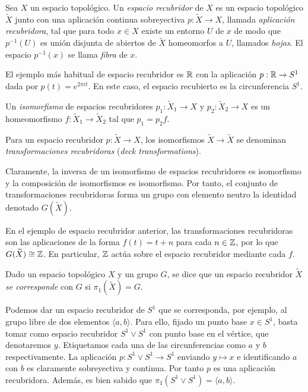 \documentclass[TFG.tex]{subfiles}
\begin{document}
\begin{defi}
Sea $X$ un espacio topológico. Un \emph{espacio recubridor} de $X$ es un espacio topológico $\widetilde{X}$ junto con una aplicación continua sobreyectiva $p:\widetilde{X}\to X$, llamada \emph{aplicación recubridora}, tal que para todo $x\in X$ existe un entorno $U$ de $x$ de modo que $p^{-1}(U)$ es unión disjunta de abiertos de $\widetilde{X}$ homeomorfos a $U$, llamados \emph{hojas}. El espacio $p^{-1}(x)$ se llama \emph{fibra} de $x$.
\end{defi}

\begin{ej}
El ejemplo más habitual de espacio recubridor es $\mathbb{R}$ con la aplicación $p:\mathbb{R}\to S^1$ dada por $p(t)=e^{2\pi i t}$. En este caso, el espacio recubierto es la circunferencia $S^1$. 
\end{ej}

\begin{defi}
Un \emph{isomorfismo} de espacios recubridores $p_1:\widetilde{X}_1\to X$ y $p_2:\widetilde{X}_2\to X$ es un homeomorfismo $f:\widetilde{X}_1\to\widetilde{X}_2$ tal que $p_1=p_2f$.
\end{defi}

\begin{defi}
Para un espacio recubridor $p:\widetilde{X}\to X$, los isomorfismos $\widetilde{X}\to\widetilde{X}$ se denominan \emph{transformaciones recubridoras} (\emph{deck transformations}). 
\end{defi}

Claramente, la inversa de un isomorfismo de espacios recubridores es isomorfismo y la composición de isomorfismos es isomorfismo. Por tanto, el conjunto de transformaciones recubridoras forma un grupo con elemento neutro la identidad denotado $G(\widetilde{X})$. 

\begin{ej}
En el ejemplo de espacio recubridor anterior, las transformaciones recubridoras son las aplicaciones de la forma $f(t)=t+n$ para cada $n\in\mathbb{Z}$, por lo que $G(\widetilde{X})\cong\mathbb{Z}$. En particular, $\mathbb{Z}$ actúa sobre el espacio recubridor mediante cada $f$. 
\end{ej}

\begin{defi}
Dado un espacio topológico $X$ y un grupo $G$, se dice que un espacio recubridor $\widetilde{X}$ \emph{se corresponde} con $G$ si $\pi_1(\widetilde{X})=G$. 
\end{defi}

\begin{ej}
Podemos dar un espacio recubridor de $S^1$ que se corresponda, por ejemplo, al grupo libre de dos elementos $\langle a, b\rangle$. Para ello, fijado un punto base $x\in S^1$, basta tomar como espacio recubridor $S^1\lor S^1$ con punto base en el vértice, que denotaremos $y$. Etiquetamos cada una de las circunferencias como $a$ y $b$ respectivamente. La aplicación $p:S^1\lor S^1\to S^1$ enviando $y\mapsto x$ e identificando $a$ con $b$ es claramente sobreyectiva y continua. Por tanto $p$ es una aplicación recubridora. Además, es bien sabido que $\pi_1(S^1\lor  S^1)=\langle a, b\rangle$. 
\end{ej}
\end{document}
